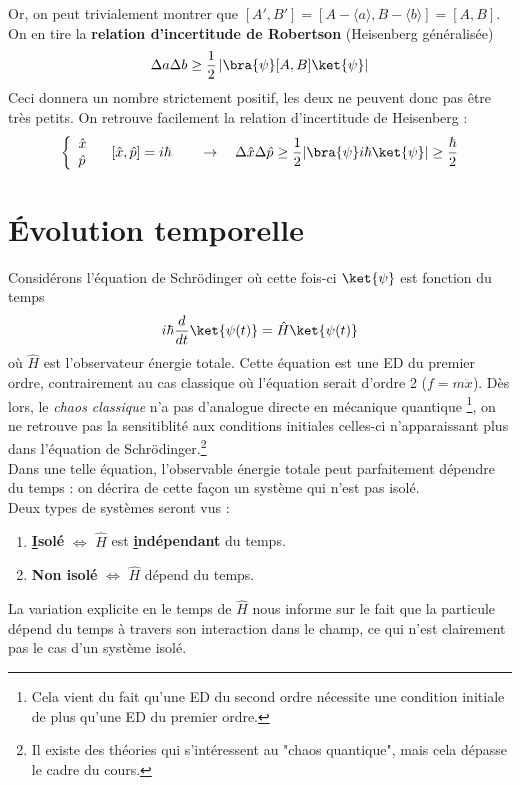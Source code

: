  Or, on peut trivialement montrer que $[A',B'] = [A-\langle a\rangle, B-\langle b\rangle]
 =[A,B]$. On en tire la \textbf{relation d'incertitude de Robertson} (Heisenberg généralisée) 
 \begin{equation}
 \Delta a \Delta b \geq \dfrac{1}{2}\left|\bra{\psi}[A,B]\ket{\psi}\right|
 \end{equation} 
 Ceci donnera un nombre strictement positif, les deux ne peuvent donc pas être très petits. 
 On retrouve facilement la relation d'incertitude de Heisenberg :
 \begin{equation}
 \left\{\begin{array}{ll}
 \hat{x}\\
 \hat{p}
 \end{array}\right.\quad [\hat{x},\hat{p}] = i\hbar\qquad\rightarrow\quad \Delta \hat{x}\Delta
 \hat{p} \geq \dfrac{1}{2}|\bra{\psi}i\hbar\ket{\psi}| \geq \dfrac{\hbar}{2}
 \end{equation}
 
\section{Évolution temporelle}
Considérons l'équation de Schrödinger où cette fois-ci $\ket{\psi}$ est fonction du 
temps
\begin{equation}
i\hbar \frac{d}{dt}\ket{\psi(t)} = \hat{H}\ket{\psi(t)}
\label{eq:Cours4.1}
\end{equation}
où $\hat{H}$ est l'observateur énergie totale. Cette équation est une ED 
du premier ordre, contrairement au cas classique où l'équation 
serait d'ordre 2 ($f=m\ddot{x}$). Dès lors, le \textit{chaos classique} n'a 
pas d'analogue directe en mécanique quantique \footnote{Cela vient du fait qu'une ED du
second ordre nécessite une condition initiale de plus qu'une ED du premier ordre.}, on ne retrouve pas la sensitiblité
aux conditions initiales celles-ci n'apparaissant plus dans l'équation de 
Schrödinger.\footnote{Il existe des théories qui s'intéressent au "chaos quantique", 
mais cela dépasse le cadre du cours.}\\

Dans une telle équation, l'observable énergie totale peut parfaitement 
dépendre du temps : on décrira de cette façon un système qui n'est pas isolé. \\
Deux types de systèmes seront vus :
\begin{enumerate}
\item \textbf{\underline{I}solé} $\Leftrightarrow$ $\hat{H}$ est \textbf{
\underline{i}ndépendant} du temps.
\item \textbf{Non isolé} $\Leftrightarrow$ $\hat{H}$ dépend du temps.
\end{enumerate}
La variation explicite en le temps de $\hat{H}$ nous informe sur le fait que 
la particule dépend du temps à travers son interaction dans le champ, ce qui 
n'est clairement pas le cas d'un système isolé.\\

